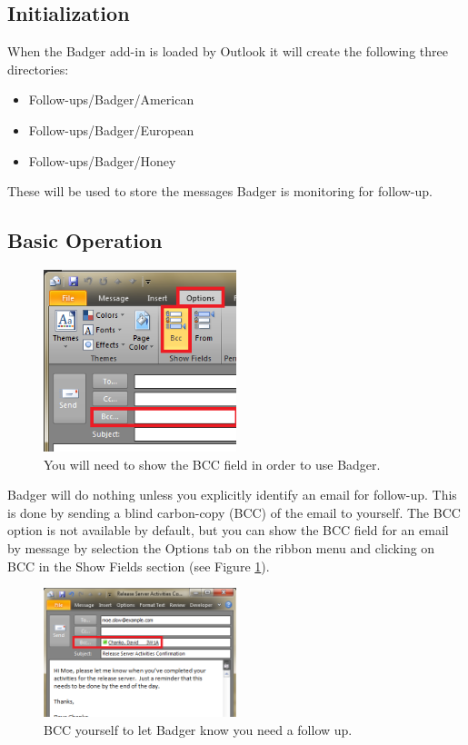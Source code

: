 \documentclass[12pt]{article}
\begin{document}
\subsection{Initialization}
\label{sec:initialization}

When the Badger add-in is loaded by Outlook it will create the following three directories:

\begin{itemize}
    \item{Follow-ups/Badger/American}
    \item{Follow-ups/Badger/European}
    \item{Follow-ups/Badger/Honey}
\end{itemize}

These will be used to store the messages Badger is monitoring for follow-up.

\subsection{Basic Operation}

\begin{figure}
    \centering
    \includegraphics[width=0.5\textwidth]{enable-bcc}
    \caption{You will need to show the BCC field in order to use Badger.}
    \label{fig:enable-bcc}
\end{figure}

Badger will do nothing unless you explicitly identify an email for follow-up. This is done by sending a blind carbon-copy (BCC) of the email to yourself. The BCC option is not available by default, but you can show the BCC field for an email by message by selection the Options tab on the ribbon menu and clicking on BCC in the Show Fields section (see Figure \ref{fig:enable-bcc}).

\begin{figure}
    \centering
    \includegraphics[width=0.5\textwidth]{bcc}
    \caption{BCC yourself to let Badger know you need a follow up.}
    \label{fig:bcc}
\end{figure}
\end{document}
